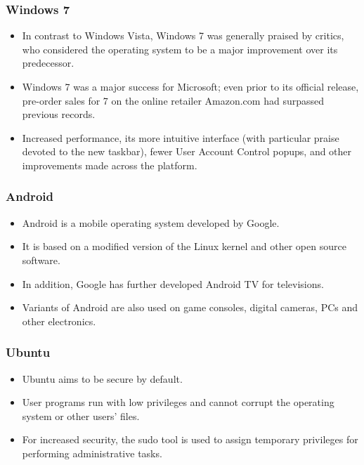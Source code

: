 \documentclass[10pt,    %
    english,            %
    xcolor=table,       %
    envcountsect        %
]{beamer}
\begin{document}
\begin{frame}
    \label{frm:second}
    \frametitle{Windows 7} 
    
    \begin{itemize}
        \item In contrast to Windows Vista, Windows 7 was generally praised by critics, who considered the operating system to be a major improvement over its predecessor.
        \item Windows 7 was a major success for Microsoft; even prior to its official release, pre-order sales for 7 on the online retailer Amazon.com had surpassed previous records.
        \item Increased performance, its more intuitive interface (with particular praise devoted to the new taskbar), fewer User Account Control popups, and other improvements made across the platform.
    \end{itemize}
\end{frame}

\begin{frame}
    \label{frm:second}
    \frametitle{Android} 
    
    \begin{itemize}
        \item Android is a mobile operating system developed by Google.
        \item It is based on a modified version of the Linux kernel and other open source software.
        \item In addition, Google has further developed Android TV for televisions.
        \item Variants of Android are also used on game consoles, digital cameras, PCs and other electronics.
    \end{itemize}
\end{frame}

\begin{frame}
    \label{frm:second}
    \frametitle{Ubuntu} 
    
    \begin{itemize}
        \item Ubuntu aims to be secure by default.
        \item User programs run with low privileges and cannot corrupt the operating system or other users' files.
        \item For increased security, the sudo tool is used to assign temporary privileges for performing administrative tasks.
    \end{itemize}
\end{frame}
\end{document}
